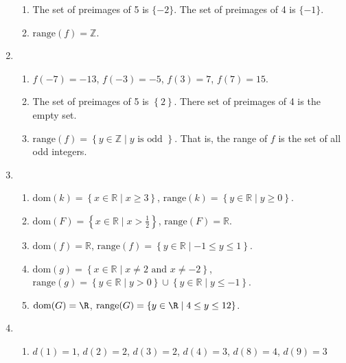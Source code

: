 \begin{enumerate}
\begin{enumerate}
\item The set of preimages of 5 is $\{ -2 \}$. The set of preimages of 4 is $\{ -1 \}$.

\item $\text{range} \left( f \right) = \mathbb{Z}$.
\end{enumerate}




\item \begin{enumerate}
\item 
$f \left( -7 \right) = -13$, 
$f \left( -3 \right) = -5$, 
$f \left( 3 \right) = 7$, 
$f \left( 7 \right) = 15$.

\item The set of preimages of  5 is  $\left\{ 2 \right\}$.  There set of preimages of 4 is 
the empty set.

\item $\text{range} \left( f \right) = \left\{ y \in \mathbb{Z} \mid y \text{ is odd } \right\}$.  That is, the range of $f$ is the set of all odd integers.
\end{enumerate}

\item \begin{enumerate}
\item $\text{dom}( k ) = \left\{ {x \in \mathbb{R}  \mid x \geq 3} \right\}$,  
$\text{range} ( k ) = \left\{ y \in \mathbb{R} \mid y \geq 0 \right\}$.

\item $\text{dom} ( F ) = \left\{ {x \in \mathbb{R} \mid x > \frac{1}{2}} \right\}$,  
$\text{range} ( F ) = \mathbb{R}$.

\item $\text{dom} ( f ) = \mathbb{R}$,
$\text{range} ( f ) = \left\{ y \in \mathbb{R} \mid -1 \leq y \leq 1 \right\}$.

\item $\text{dom} ( g ) = \left\{ {x \in \mathbb{R} \mid x \ne 2\text{  and  }x \ne  - 2} \right\}$, \\
$\text{range} ( g ) = \left\{ { {y \in \mathbb{R} } \mid y > 0} \right\} \cup 
\left\{ {y \in \mathbb{R} \mid y \leqslant  - 1} \right\}$.

\item $\text{dom} (G) = \R$, 
$\text{range} (G) = \left\{ y \in \R \mid 4 \leq y \leq 12 \right\}$.
\end{enumerate}



\item \begin{enumerate}
\item $d ( 1 ) = 1$, $d ( 2 ) = 2$, $d ( 3 ) = 2$, 
$d ( 4 ) = 3$, $d ( 8 ) = 4$, $d ( 9 ) = 3$


\end{enumerate}
\end{enumerate}
